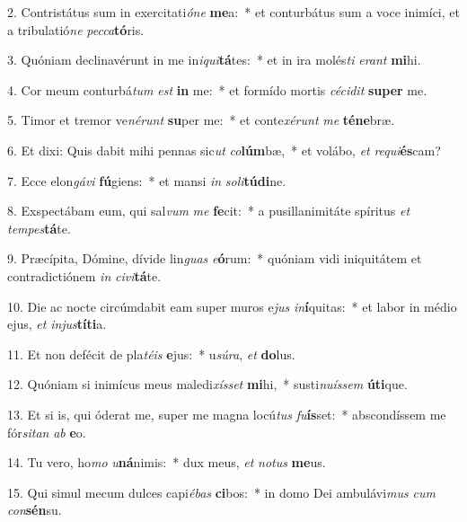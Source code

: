 2. Contristátus sum in exercitati\textit{ó}\textit{ne} \textbf{me}a:~*  et conturbátus sum a voce inimíci, et a tribulatió\textit{ne} \textit{pec}\textit{ca}\textbf{tó}ris.\

3. Quóniam declinavérunt in me in\textit{i}\textit{qui}\textbf{tá}tes:~*  et in ira molés\textit{ti} \textit{e}\textit{rant} \textbf{mi}hi.\

4. Cor meum conturbá\textit{tum} \textit{est} \textbf{in} me:~*  et formído mortis \textit{cé}\textit{ci}\textit{dit} \textbf{su}\textbf{per} me.\

5. Timor et tremor ve\textit{né}\textit{runt} \textbf{su}per me:~*  et conte\textit{xé}\textit{runt} \textit{me} \textbf{té}\textbf{ne}bræ.\

6. Et dixi: Quis dabit mihi pennas sic\textit{ut} \textit{co}\textbf{lúm}bæ,~*  et volábo, \textit{et} \textit{re}\textit{qui}\textbf{és}cam?\

7. Ecce elon\textit{gá}\textit{vi} \textbf{fú}giens:~*  et mansi \textit{in} \textit{so}\textit{li}\textbf{tú}\textbf{di}ne.\

8. Exspectábam eum, qui sal\textit{vum} \textit{me} \textbf{fe}cit:~*  a pusillanimitáte spíritus \textit{et} \textit{tem}\textit{pes}\textbf{tá}te.\

9. Præcípita, Dómine, dívide lin\textit{guas} \textit{e}\textbf{ó}rum:~*  quóniam vidi iniquitátem et contradictiónem \textit{in} \textit{ci}\textit{vi}\textbf{tá}te.\

10. Die ac nocte circúmdabit eam super muros e\textit{jus} \textit{in}\textbf{í}quitas:~*  et labor in médio ejus, \textit{et} \textit{in}\textit{jus}\textbf{tí}\textbf{ti}a.\

11. Et non defécit de pla\textit{té}\textit{is} \textbf{e}jus:~*  u\textit{sú}\textit{ra}, \textit{et} \textbf{do}lus.\

12. Quóniam si inimícus meus maledi\textit{xís}\textit{set} \textbf{mi}hi,~*  susti\textit{nu}\textit{ís}\textit{sem} \textbf{ú}\textbf{ti}que.\

13. Et si is, qui óderat me, super me magna locú\textit{tus} \textit{fu}\textbf{ís}set:~*  abscondíssem me fór\textit{si}\textit{tan} \textit{ab} \textbf{e}o.\

14. Tu vero, ho\textit{mo} \textit{u}\textbf{ná}nimis:~*  dux meus, \textit{et} \textit{no}\textit{tus} \textbf{me}us.\

15. Qui simul mecum dulces capi\textit{é}\textit{bas} \textbf{ci}bos:~*  in domo Dei ambulávi\textit{mus} \textit{cum} \textit{con}\textbf{sén}su.\

